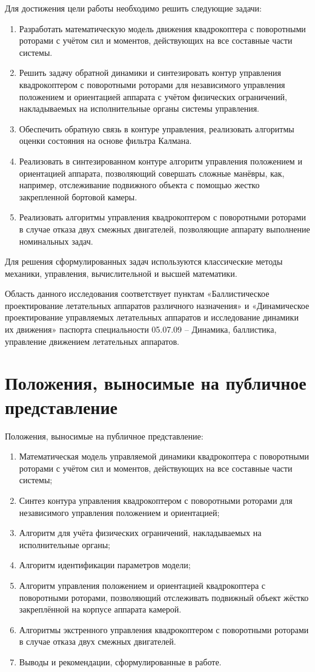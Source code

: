 Для достижения цели работы необходимо решить следующие задачи:
\begin{enumerate}
	\item Разработать математическую модель движения квадрокоптера с поворотными роторами с учётом сил и моментов, действующих на все составные части системы.
	\item Решить задачу обратной динамики и синтезировать контур управления квадрокоптером с поворотными роторами для независимого управления положением и ориентацией аппарата с учётом физических ограничений, накладываемых на исполнительные органы системы управления.
	\item Обеспечить обратную связь в контуре управления, реализовать алгоритмы оценки состояния на основе фильтра Калмана.
	\item Реализовать в синтезированном контуре алгоритм управления положением и ориентацией аппарата, позволяющий совершать сложные манёвры, как, например, отслеживание подвижного объекта с помощью жестко закрепленной бортовой камеры.
	\item Реализовать алгоритмы управления квадрокоптером с поворотными роторами в случае отказа двух смежных двигателей, позволяющие аппарату выполнение номинальных задач.
\end{enumerate}
Для решения сформулированных задач используются классические методы механики, управления, вычислительной и высшей математики.

Область данного исследования соответствует пунктам «Баллистическое проектирование летательных аппаратов различного назначения» и «Динамическое проектирование управляемых летательных аппаратов и исследование динамики их движения» паспорта специальности 05.07.09 – Динамика, баллистика, управление движением летательных аппаратов.

\section{Положения, выносимые на публичное представление}
Положения, выносимые на публичное представление:
\begin{enumerate}
\item Математическая модель управляемой динамики квадрокоптера с поворотными роторами с учётом сил и моментов, действующих на все составные части системы;
\item Синтез контура управления квадрокоптером с поворотными роторами для независимого управления положением и ориентацией; 
\item Алгоритм для учёта физических ограничений, накладываемых на исполнительные органы;
\item Алгоритм идентификации параметров модели;
\item Алгоритм управления положением и ориентацией квадрокоптера с поворотными роторами, позволяющий отслеживать подвижный объект жёстко закреплённой на корпусе аппарата камерой.
\item Алгоритмы экстренного управления квадрокоптером с поворотными роторами в случае отказа двух смежных двигателей.
\item Выводы и рекомендации, сформулированные в работе.
\end{enumerate}

